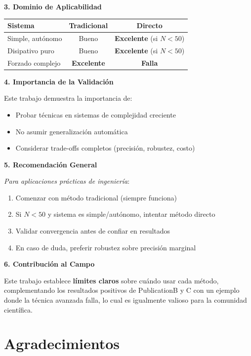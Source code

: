 \documentclass[11pt,a4paper]{article}
\begin{document}
\textbf{3. Dominio de Aplicabilidad}

\begin{center}
\begin{tabular}{lcc}
\toprule
\textbf{Sistema} & \textbf{Tradicional} & \textbf{Directo} \\
\midrule
Simple, autónomo & Bueno & \textbf{Excelente} (si $N < 50$) \\
Disipativo puro & Bueno & \textbf{Excelente} (si $N < 50$) \\
Forzado complejo & \textbf{Excelente} & \textbf{Falla} \\
\bottomrule
\end{tabular}
\end{center}

\textbf{4. Importancia de la Validación}

Este trabajo demuestra la importancia de:
\begin{itemize}
\item Probar técnicas en sistemas de complejidad creciente
\item No asumir generalización automática
\item Considerar trade-offs completos (precisión, robustez, costo)
\end{itemize}

\textbf{5. Recomendación General}

\textit{Para aplicaciones prácticas de ingeniería}:
\begin{enumerate}
\item Comenzar con método tradicional (siempre funciona)
\item Si $N < 50$ y sistema es simple/autónomo, intentar método directo
\item Validar convergencia antes de confiar en resultados
\item En caso de duda, preferir robustez sobre precisión marginal
\end{enumerate}

\textbf{6. Contribución al Campo}

Este trabajo establece \textbf{límites claros} sobre cuándo usar cada método, complementando los resultados positivos de PublicationB y C con un ejemplo donde la técnica avanzada falla, lo cual es igualmente valioso para la comunidad científica.

\section*{Agradecimientos}
\end{document}
